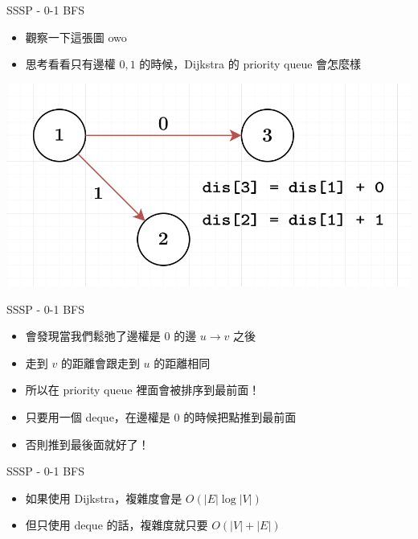 \documentclass[aspectratio=169]{beamer}
\begin{document}
    \begin{frame}{SSSP - 0-1 BFS}
        \begin{itemize}
            \item 觀察一下這張圖 owo
            \item 思考看看只有邊權 $0,1$ 的時候，Dijkstra 的 priority queue 會怎麼樣 
        \end{itemize}
        \begin{center}
            \includegraphics[scale=0.4]{images/01bfs.png}
        \end{center}
    \end{frame}
    
    \begin{frame}{SSSP - 0-1 BFS}
        \begin{itemize}
            \item 會發現當我們鬆弛了邊權是 $0$ 的邊 $u \rightarrow v$ 之後
            \item 走到 $v$ 的距離會跟走到 $u$ 的距離相同
            \item 所以在 priority queue 裡面會被排序到最前面！
            \item<2-> 只要用一個 deque，在邊權是 $0$ 的時候把點推到最前面
            \item<2-> 否則推到最後面就好了！
        \end{itemize}
    \end{frame}

    
    \begin{frame}{SSSP - 0-1 BFS}
        \begin{itemize}
            \item 如果使用 Dijkstra，複雜度會是 $O(|E| \log |V|)$
            \item 但只使用 deque 的話，複雜度就只要 $O(|V|+|E|)$ 
        \end{itemize}
    \end{frame}
    
\end{document}
